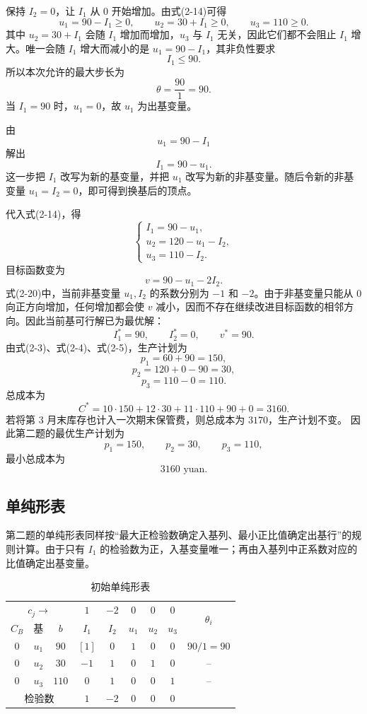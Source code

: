 ﻿\documentclass[UTF8,zihao=-4,fontset=none]{ctexart}
\begin{document}
保持 \(I_2=0\)，让 \(I_1\) 从 \(0\) 开始增加。由式(2-14)可得
\[
    u_1=90-I_1\ge 0,\qquad
    u_2=30+I_1\ge 0,\qquad
    u_3=110\ge 0.
\]
其中 \(u_2=30+I_1\) 会随 \(I_1\) 增加而增加，\(u_3\) 与 \(I_1\) 无关，因此它们都不会阻止 \(I_1\) 增大。唯一会随 \(I_1\) 增大而减小的是 \(u_1=90-I_1\)，其非负性要求
\[
    I_1\le 90.
\]
所以本次允许的最大步长为
\[
    \theta=\frac{90}{1}=90. \tag{2-17}
\]
当 \(I_1=90\) 时，\(u_1=0\)，故 \(u_1\) 为出基变量。

由
\[
    u_1=90-I_1
\]
解出
\[
    I_1=90-u_1. \tag{2-18}
\]
这一步把 \(I_1\) 改写为新的基变量，并把 \(u_1\) 改写为新的非基变量。随后令新的非基变量 \(u_1=I_2=0\)，即可得到换基后的顶点。

代入式(2-14)，得
\[
    \begin{cases}
    I_1=90-u_1,\\
    u_2=120-u_1-I_2,\\
    u_3=110-I_2.
    \end{cases} \tag{2-19}
\]
目标函数变为
\[
    v=90-u_1-2I_2. \tag{2-20}
\]
式(2-20)中，当前非基变量 \(u_1,I_2\) 的系数分别为 \(-1\) 和 \(-2\)。由于非基变量只能从 \(0\) 向正方向增加，任何增加都会使 \(v\) 减小，因而不存在继续改进目标函数的相邻方向。因此当前基可行解已为最优解：
\[
    I_1^*=90,\qquad I_2^*=0,\qquad v^*=90. \tag{2-21}
\]
由式(2-3)、式(2-4)、式(2-5)，生产计划为
\[
    p_1=60+90=150,
\]
\[
    p_2=120+0-90=30,
\]
\[
    p_3=110-0=110.
\]
总成本为
\[
    C^*=10\cdot150+12\cdot30+11\cdot110+90+0=3160.
\]
若将第 \(3\) 月末库存也计入一次期末保管费，则总成本为 \(3170\)，生产计划不变。
因此第二题的最优生产计划为
\[
    \boxed{p_1=150,\qquad p_2=30,\qquad p_3=110,}
\]
最小总成本为
\[
    \boxed{3160\text{ yuan}.}
\]

\subsection{单纯形表}

第二题的单纯形表同样按“最大正检验数确定入基列、最小正比值确定出基行”的规则计算。由于只有 \(I_1\) 的检验数为正，入基变量唯一；再由入基列中正系数对应的比值确定出基变量。

\begin{table}[H]
\centering
{}
\setlength{\tabcolsep}{4pt}
\caption{初始单纯形表}
\begin{tabular}{ccccccccc}
\toprule
\multicolumn{3}{c}{$c_j\rightarrow$} & \(1\) & \(-2\) & \(0\) & \(0\) & \(0\) & \multirow{2}{*}{\(\theta_i\)}\\
\(C_B\) & 基 & \(b\) & \(I_1\) & \(I_2\) & \(u_1\) & \(u_2\) & \(u_3\) &\\
\midrule
\(0\) & \(u_1\) & \(90\)  & \([1]\) & \(0\) & \(1\) & \(0\) & \(0\) & \(90/1=90\)\\
\(0\) & \(u_2\) & \(30\)  & \(-1\) & \(1\) & \(0\) & \(1\) & \(0\) & --\\
\(0\) & \(u_3\) & \(110\) & \(0\) & \(1\) & \(0\) & \(0\) & \(1\) & --\\
\multicolumn{3}{c}{检验数} & \(1\) & \(-2\) & \(0\) & \(0\) & \(0\) &\\
\bottomrule
\end{tabular}
\end{table}
\end{document}
